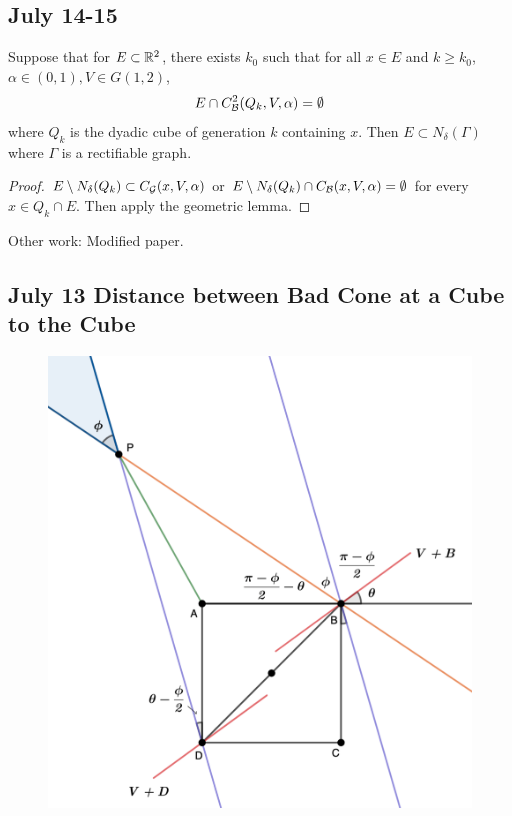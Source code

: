 \subsection{July 14-15}

\begin{lemma}
    Suppose that for $E\subset \mathbb{R}^2$, there exists $k_0$ such that for all $x\in E$ and $k\geq k_0$, $\alpha\in(0,1), V\in G(1,2)$,
    \begin{equation*}
        E\cap C_\mathcal B^2(Q_k, V, \alpha) = \emptyset
    \end{equation*}
    where $Q_k$ is the dyadic cube of generation $k$ containing $x$. Then $E\subset N_\delta(\Gamma)$ where $\Gamma$ is a rectifiable graph. 
\end{lemma}
\begin{proof}
    $E\setminus N_\delta(Q_k) \subset C_\mathcal G(x, V, \alpha)$ or $E\setminus N_\delta(Q_k)\cap C_\mathcal B(x, V, \alpha) = \emptyset$ for every $x\in Q_k\cap E$. Then apply the geometric lemma.
\end{proof}

Other work: Modified paper.


\newpage
\subsection{July 13 Distance between Bad Cone at a Cube to the Cube}

\begin{figure}[H]
    \centering
    \includegraphics[width=.66\textwidth]{images/dist-CBQ2Q.png}
\end{figure}

